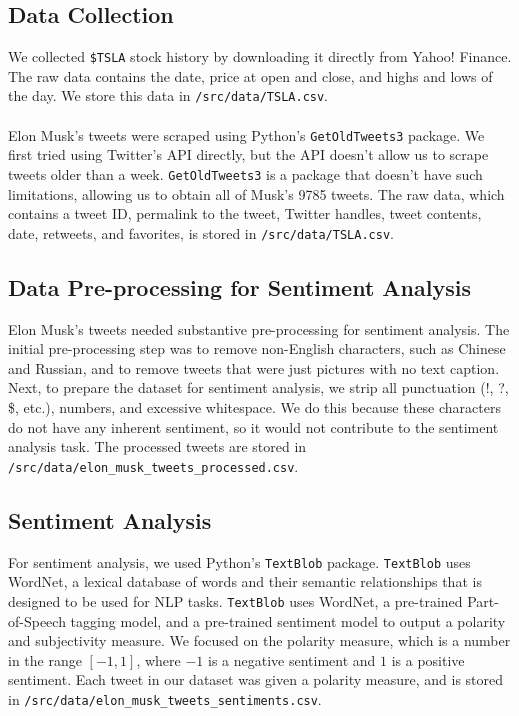 \documentclass[12pt, notitlepage]{article}
\begin{document}
\subsection{Data Collection}
We collected \texttt{\$TSLA} stock history by downloading it directly from Yahoo! Finance. The raw data contains the date, price at open and close, and highs and lows of the day. We store this data in \texttt{/src/data/TSLA.csv}. \\\\
Elon Musk's tweets were scraped using Python's \texttt{GetOldTweets3} package. We first tried using Twitter's API directly, but the API doesn't allow us to scrape tweets older than a week. \texttt{GetOldTweets3} is a package that doesn't have such limitations, allowing us to obtain all of Musk's 9785 tweets. The raw data, which contains a tweet ID, permalink to the tweet, Twitter handles, tweet contents, date, retweets, and favorites, is stored in \texttt{/src/data/TSLA.csv}.

\subsection{Data Pre-processing for Sentiment Analysis}
Elon Musk's tweets needed substantive pre-processing for sentiment analysis. The initial pre-processing step was to remove non-English characters, such as Chinese and Russian, and to remove tweets that were just pictures with no text caption. Next, to prepare the dataset for sentiment analysis, we strip all punctuation (!, ?, \$, etc.), numbers, and excessive whitespace. We do this because these characters do not have any inherent sentiment, so it would not contribute to the sentiment analysis task. The processed tweets are stored in \texttt{/src/data/elon\_musk\_tweets\_processed.csv}.

\subsection{Sentiment Analysis}
For sentiment analysis, we used Python's \texttt{TextBlob} package. \texttt{TextBlob} uses WordNet, a lexical database of words and their semantic relationships that is designed to be used for NLP tasks. \texttt{TextBlob} uses WordNet, a pre-trained Part-of-Speech tagging model, and a pre-trained sentiment model to output a polarity and subjectivity measure. We focused on the polarity measure, which is a number in the range $[-1,1]$, where $-1$ is a negative sentiment and $1$ is a positive sentiment. Each tweet in our dataset was given a polarity measure, and is stored in \texttt{/src/data/elon\_musk\_tweets\_sentiments.csv}.
\end{document}
